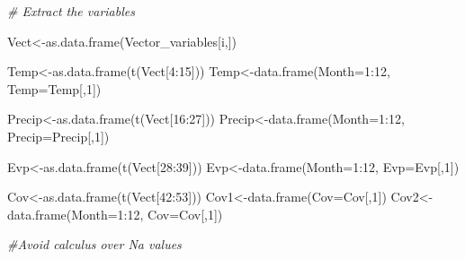 \documentclass[
  10pt,
  b5paper,
]{book}
\newenvironment{Shaded}{\begin{snugshade}}{\end{snugshade}}
\newcommand{\AttributeTok}[1]{\textcolor[rgb]{0.77,0.63,0.00}{#1}}
\newcommand{\CommentTok}[1]{\textcolor[rgb]{0.56,0.35,0.01}{\textit{#1}}}
\newcommand{\DecValTok}[1]{\textcolor[rgb]{0.00,0.00,0.81}{#1}}
\newcommand{\FunctionTok}[1]{\textcolor[rgb]{0.00,0.00,0.00}{#1}}
\newcommand{\NormalTok}[1]{#1}
\newcommand{\OtherTok}[1]{\textcolor[rgb]{0.56,0.35,0.01}{#1}}
\newcommand{\SpecialCharTok}[1]{\textcolor[rgb]{0.00,0.00,0.00}{#1}}
\begin{document}
\begin{Shaded}
\begin{Highlighting}[]
\CommentTok{\# Extract the variables }

\NormalTok{Vect}\OtherTok{\textless{}{-}}\FunctionTok{as.data.frame}\NormalTok{(Vector\_variables[i,])}

\NormalTok{Temp}\OtherTok{\textless{}{-}}\FunctionTok{as.data.frame}\NormalTok{(}\FunctionTok{t}\NormalTok{(Vect[}\DecValTok{4}\SpecialCharTok{:}\DecValTok{15}\NormalTok{]))}
\NormalTok{Temp}\OtherTok{\textless{}{-}}\FunctionTok{data.frame}\NormalTok{(}\AttributeTok{Month=}\DecValTok{1}\SpecialCharTok{:}\DecValTok{12}\NormalTok{, }\AttributeTok{Temp=}\NormalTok{Temp[,}\DecValTok{1}\NormalTok{])}

\NormalTok{Precip}\OtherTok{\textless{}{-}}\FunctionTok{as.data.frame}\NormalTok{(}\FunctionTok{t}\NormalTok{(Vect[}\DecValTok{16}\SpecialCharTok{:}\DecValTok{27}\NormalTok{]))}
\NormalTok{Precip}\OtherTok{\textless{}{-}}\FunctionTok{data.frame}\NormalTok{(}\AttributeTok{Month=}\DecValTok{1}\SpecialCharTok{:}\DecValTok{12}\NormalTok{, }\AttributeTok{Precip=}\NormalTok{Precip[,}\DecValTok{1}\NormalTok{])}

\NormalTok{Evp}\OtherTok{\textless{}{-}}\FunctionTok{as.data.frame}\NormalTok{(}\FunctionTok{t}\NormalTok{(Vect[}\DecValTok{28}\SpecialCharTok{:}\DecValTok{39}\NormalTok{]))}
\NormalTok{Evp}\OtherTok{\textless{}{-}}\FunctionTok{data.frame}\NormalTok{(}\AttributeTok{Month=}\DecValTok{1}\SpecialCharTok{:}\DecValTok{12}\NormalTok{, }\AttributeTok{Evp=}\NormalTok{Evp[,}\DecValTok{1}\NormalTok{])}
    
\NormalTok{Cov}\OtherTok{\textless{}{-}}\FunctionTok{as.data.frame}\NormalTok{(}\FunctionTok{t}\NormalTok{(Vect[}\DecValTok{42}\SpecialCharTok{:}\DecValTok{53}\NormalTok{]))}
\NormalTok{Cov1}\OtherTok{\textless{}{-}}\FunctionTok{data.frame}\NormalTok{(}\AttributeTok{Cov=}\NormalTok{Cov[,}\DecValTok{1}\NormalTok{])}
\NormalTok{Cov2}\OtherTok{\textless{}{-}}\FunctionTok{data.frame}\NormalTok{(}\AttributeTok{Month=}\DecValTok{1}\SpecialCharTok{:}\DecValTok{12}\NormalTok{, }\AttributeTok{Cov=}\NormalTok{Cov[,}\DecValTok{1}\NormalTok{])}

\CommentTok{\#Avoid calculus over Na values }


\end{Highlighting}
\end{Shaded}
\end{document}
